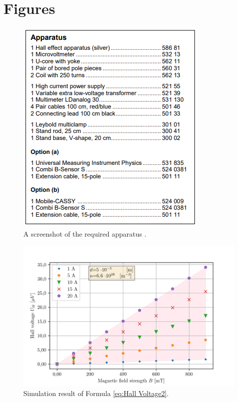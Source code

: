\newpage

\chapter{Figures}

    \begin{figure}[!htbp]
    \begin{center}
    \includegraphics[scale=0.9]{figuren/apparatus.png}
    \end{center}
    \caption{A screenshot of the required apparatus \cite{halleffectzilver}.}\label{fig:apparatus}
    \end{figure}

    \begin{figure}[!htbp]
    \begin{center}
    \includegraphics[scale=0.9]{figuren/simulatie/B.png}
    \end{center}
    \caption{Simulation result of Formula \ref{eq:Hall Voltage2}.}  \label{fig:sim_B}
    \end{figure}
    
